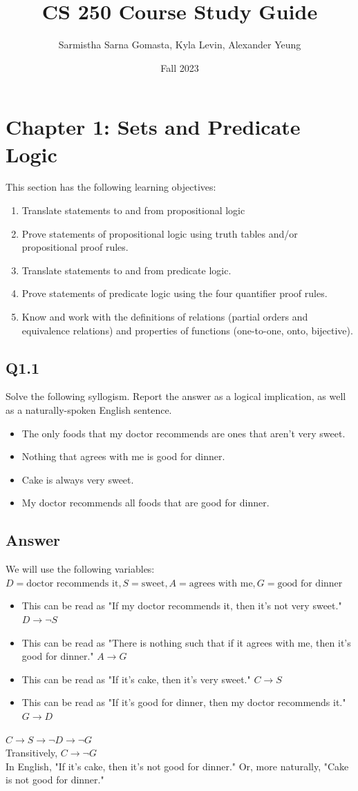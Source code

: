 \documentclass{article}
\title{CS 250 Course Study Guide}
\author{Sarmistha Sarna Gomasta, Kyla Levin, Alexander Yeung}
\date{Fall 2023}
\begin{document}
\maketitle

\section*{Chapter 1: Sets and Predicate Logic}
This section has the following learning objectives:
\begin{enumerate}
    \item Translate statements to and from propositional logic
    \item Prove statements of propositional logic using truth tables and/or propositional proof rules.
    \item Translate statements to and from predicate logic.
    \item Prove statements of predicate logic using the four quantifier proof rules.
    \item Know and work with the definitions of relations (partial orders and equivalence relations) and properties of functions (one-to-one, onto, bijective).
\end{enumerate}
\subsection*{Q1.1}
Solve the following syllogism. Report the answer as a logical implication, as well as a naturally-spoken English sentence.
\begin{itemize}
    \item The only foods that my doctor recommends are ones that aren't very sweet.
    \item Nothing that agrees with me is good for dinner.
    \item Cake is always very sweet.
    \item My doctor recommends all foods that are good for dinner.
\end{itemize}
\newpage
\subsection*{Answer}
We will use the following variables: $D=\text{doctor recommends it},S=\text{sweet},A=\text{agrees with me},G=\text{good for dinner}$
\begin{itemize}
    \item This can be read as "If my doctor recommends it, then it's not very sweet." $D\rightarrow \neg S$
    \item This can be read as "There is nothing such that if it agrees with me, then it's good for dinner." $A\rightarrow G$
    \item This can be read as "If it's cake, then it's very sweet." $C\rightarrow S$
    \item This can be read as "If it's good for dinner, then my doctor recommends it." $G\rightarrow D$
\end{itemize}
$C\rightarrow S\rightarrow \neg D\rightarrow\neg G$
\\ Transitively, $C\rightarrow\neg G$
\\ In English, "If it's cake, then it's not good for dinner." Or, more naturally, "Cake is not good for dinner."
\newpage
\end{document}

